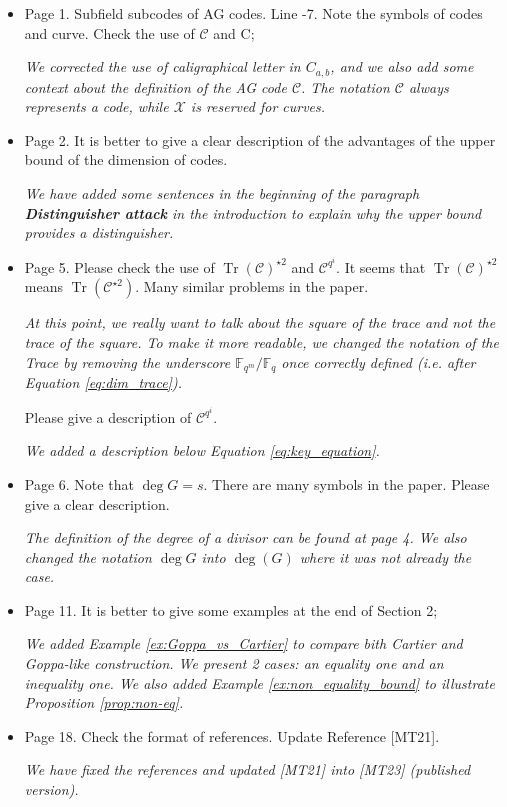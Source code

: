 \documentclass[12pt,a4paper]{amsart}
\DeclareMathOperator{\trace}{Tr}
\newcommand{\calC}{\mathcal{C}}
\newcommand{\calX}{\mathcal{X}}
\newcommand{\Tr}[1]{\trace\!\left(#1\right)}
\begin{document}
\begin{itemize}
 
\item  Page 1. Subfield subcodes of AG codes. Line -7. Note the symbols of codes and curve. Check the use of $\calC$ and C; 

\textit{We corrected the use of caligraphical letter in $C_{a,b}$, and we also add some context about the definition of the AG code $\calC$. The notation $\calC$ always represents a code, while $\calX$ is reserved for curves.}
 
\item Page 2. It is better to give a clear description of the advantages of the upper bound of the dimension of codes.

\textit{We have added some sentences in the beginning of the paragraph \textbf{Distinguisher attack} in the introduction to explain why the upper bound provides a distinguisher.}


\item  Page 5. Please check the use of $\Tr{\calC}^{\star 2}$ and $\calC^{q^i}$. It seems that $\Tr{\calC}^{\star 2}$ means $\Tr{\calC^{\star 2}}$. Many similar problems in the paper.

\textit{At this point, we really want to talk about the square of the trace and not the trace of the square. To make it more readable, we changed the notation of the Trace by removing the underscore $\mathbb{F}_{q^m}/\mathbb{F}_q$ once correctly defined (i.e. after Equation \eqref{eq:dim_trace}).}

\noindent Please give a description of $\calC^{q^i}$.
 
\textit{We added a description below Equation \eqref{eq:key_equation}.}

\item Page 6. Note that $\deg G = s$. There are many symbols in the paper. Please give a clear description.

\textit{The definition of the degree of a divisor can be found at page 4. We also changed the notation $\deg G$ into $\deg(G)$ where it was not already the case.}


\item Page 11. It is better to give some examples at the end of Section 2;

\textit{We added Example \ref{ex:Goppa_vs_Cartier} to compare bith Cartier and Goppa-like construction. We present 2 cases: an equality one and an inequality one. We also added Example \ref{ex:non_equality_bound} to illustrate Proposition \ref{prop:non-eq}.}



\item Page 18. Check the format of references. Update Reference [MT21].

\textit{We have fixed the references and updated [MT21] into [MT23] (published version).}

\end{itemize} 
\end{document}
